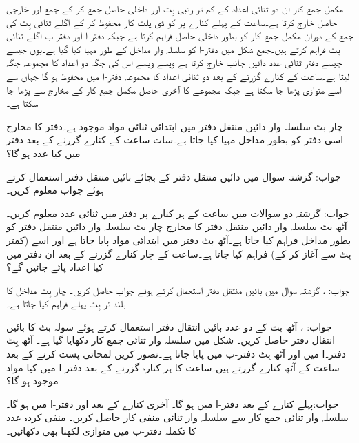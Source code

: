 مکمل جمع کار ان دو ثنائی اعداد کے کم تر رتبی بِٹ اور داخلی حاصل  جمع کر کے جمع  اور خارجی حاصل  خارج کرتا ہے۔ساعت کے پہلے کنارے پر  کو ڈی پلٹ کار محفوظ کر کے اگلے ثنائی بِٹ کی جمع کے دوران مکمل جمع کار کو بطور داخلی حاصل فراہم کرتا ہے جبکہ دفتر-ا اور دفتر-ب اگلے ثنائی بِٹ فراہم کرتے ہیں۔جمع  شکل میں دفتر-ا کو سلسلہ وار مداخل کے طور مہیا کیا گیا ہے۔یوں جیسے جیسے دفتر ثنائی عدد  دائیں جانب خارج کرتا ہے ویسے ویسے اس کی جگہ دو اعداد کا مجموعہ جگہ لیتا ہے۔ساعت کے  کنارے گزرنے کے بعد دو ثنائی اعداد کا مجموعہ دفتر-ا میں محفوظ ہو گا جہاں سے اسے متوازی پڑھا جا سکتا ہے جبکہ مجموعے کا آخری حاصل مکمل جمع کار کے مخارج  سے پڑھا جا سکتا ہے۔

 چار بٹ  سلسلہ وار دائیں منتقل دفتر میں ابتدائی ثنائی مواد   موجود ہے۔دفتر کا مخارج  اسی دفتر کو بطور مداخل مہیا کیا جاتا ہے۔سات ساعت کے کنارے گزرنے کے بعد دفتر میں کیا عدد ہو گا؟
 
 جواب: 
  گزشتہ سوال میں دائیں منتقل دفتر کے بجائے بائیں منتقل دفتر استعمال کرتے ہوئے  جواب معلوم کریں۔
  
  جواب: 
 گزشتہ دو سوالات میں  ساعت  کے ہر کنارے پر دفتر میں ثنائی عدد  معلوم  کریں۔
 آٹھ بٹ  سلسلہ وار دائیں منتقل دفتر کا  مخارج  چار بٹ  سلسلہ وار دائیں منتقل دفتر  کو بطور مداخل فراہم کیا جاتا ہے۔آٹھ بٹ دفتر میں ابتدائی مواد  پایا جاتا ہے  اور  اسے     (کمتر بِٹ سے آغاز کر کے)    فراہم کیا جاتا ہے۔ساعت کے چار  کنارے گزرنے کے بعد ان دفتر  میں کیا اعداد پائے جائیں گے؟
 
 جواب: ،  
 گزشتہ سوال میں  بائیں منتقل دفتر استعمال کرتے  ہوئے جواب حاصل کریں۔ چار بِٹ مداخل کا بلند تر بِٹ پہلے فراہم کیا جاتا ہے۔
 
 جواب: ، 
 آٹھ بٹ کے دو عدد بائیں  انتقال  دفتر استعمال کرتے ہوئے سولہ بٹ کا  بائیں انتقال دفتر حاصل کریں۔
 شکل     میں سلسلہ وار ثنائی جمع کار دکھایا گیا ہے۔ آٹھ بِٹ دفتر۔ا  میں   اور  آٹھ بِٹ دفتر-ب   میں  پایا جاتا ہے۔تصور کریں     لمحاتی  پست کرنے کے بعد ساعت کے آٹھ کنارے گزرتے ہیں۔ساعت کا ہر کنارہ گزرنے کے بعد دفتر-ا میں  کیا مواد موجود ہو گا؟
 
 جواب:پہلے کنارے کے بعد دفتر-ا میں  ہو گا۔  آخری کنارے کے بعد  اور  دفتر-ا میں  ہو گا۔
 سلسلہ وار ثنائی جمع کار سے سلسلہ وار ثنائی منفی کار حاصل کریں۔ منفی  کردہ عدد کا تکملہ  دفتر-ب میں متوازی لکھنا بھی دکھائیں۔

